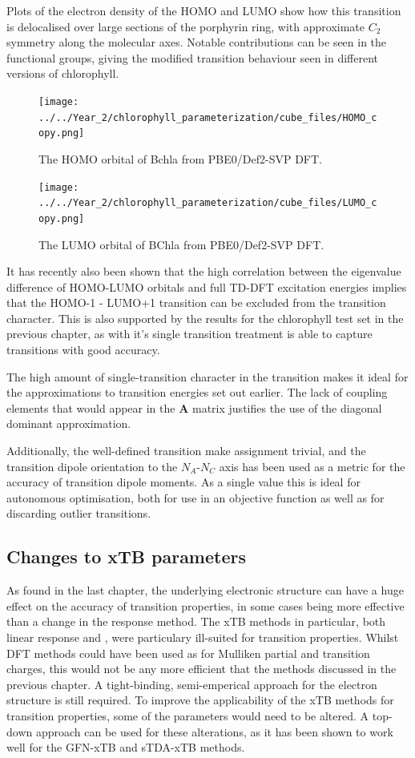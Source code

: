 Plots of the electron density of the HOMO and LUMO show how this transition is delocalised
over large sections of the porphyrin ring, with approximate $C_2$ symmetry along
the molecular axes. Notable contributions can be seen in the functional groups,
giving the modified transition behaviour seen in different versions of chlorophyll.

\begin{figure}
    \centering
    \texttt{[image: ../../Year\_2/chlorophyll\_parameterization/cube\_files/HOMO\_copy.png]}
    \caption{The HOMO orbital of Bchla from PBE0/Def2-SVP DFT.}
    \label{fig:HOMO}
\end{figure}

\begin{figure}
    \centering
    \texttt{[image: ../../Year\_2/chlorophyll\_parameterization/cube\_files/LUMO\_copy.png]}
    \caption{The LUMO orbital of BChla from PBE0/Def2-SVP DFT.}
\end{figure}

It has recently also been shown that the high correlation between the eigenvalue
difference of HOMO-LUMO orbitals and full TD-DFT excitation energies implies that
the HOMO-1 - LUMO+1 transition can be excluded from the transition character. This
is also supported by the results for the chlorophyll test set in the previous chapter,
as \dscf with it's single transition treatment is able to capture \Qy transitions
with good accuracy.

The high amount of single-transition character in the \Qy transition makes it ideal
for the approximations to transition energies set out earlier. The lack of coupling
elements that would appear in the $\mathbf{A}$ matrix justifies the use of the diagonal
dominant approximation.

Additionally, the well-defined transition make assignment trivial, and the transition
dipole orientation to the $N_A$-$N_C$ axis has been used as a metric for the accuracy
of transition dipole moments. As a single value this is ideal for autonomous optimisation,
both for use in an objective function as well as for discarding outlier transitions.

\subsection{Changes to xTB parameters}
\label{subsec:chl_method}

As found in the last chapter, the underlying electronic structure can have a huge
effect on the accuracy of transition properties, in some cases being more effective
than a change in the response method. The xTB methods in particular, both linear
response and \dxtb, were particulary ill-suited for transition properties. Whilst
DFT methods could have been used as for Mulliken partial and transition charges,
this would not be any more efficient that the \dscf methods discussed in the previous 
chapter. A tight-binding, semi-emperical approach for the electron structure is still 
required. To improve the applicability of the xTB methods for transition properties, 
some of the parameters would need to be altered. A top-down approach can be used 
for these alterations, as it has been shown to work well for the GFN-xTB and sTDA-xTB
methods. 


